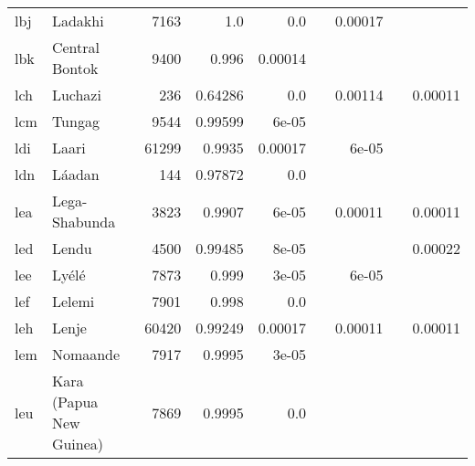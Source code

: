 \documentclass[11pt]{article}
\begin{document}
\begin{table*}[h]
{\begin{tabular}{llrrrrrrr}
lbj         & Ladakhi         & 7163         & 1.0         & 0.0         &          & 0.00017         &          &          \\

lbk         & Central Bontok         & 9400         & 0.996         & 0.00014         &          &          &          &          \\

lch         & Luchazi         & 236         & 0.64286         & 0.0         &          & 0.00114         &          & 0.00011         \\

lcm         & Tungag         & 9544         & 0.99599         & 6e-05         &          &          &          &          \\

ldi         & Laari         & 61299         & 0.9935         & 0.00017         &          & 6e-05         &          &          \\

ldn         & Láadan         & 144         & 0.97872         & 0.0         &          &          &          &          \\

lea         & Lega-Shabunda         & 3823         & 0.9907         & 6e-05         &          & 0.00011         &          & 0.00011         \\

led         & Lendu         & 4500         & 0.99485         & 8e-05         &          &          &          & 0.00022         \\

lee         & Lyélé         & 7873         & 0.999         & 3e-05         &          & 6e-05         &          &          \\

lef         & Lelemi         & 7901         & 0.998         & 0.0         &          &          &          &          \\

leh         & Lenje         & 60420         & 0.99249         & 0.00017         &          & 0.00011         &          & 0.00011         \\

lem         & Nomaande         & 7917         & 0.9995         & 3e-05         &          &          &          &          \\

leu         & Kara (Papua New Guinea)         & 7869         & 0.9995         & 0.0         &          &          &          &          \\


\end{tabular}}
\end{table*}
\end{document}
